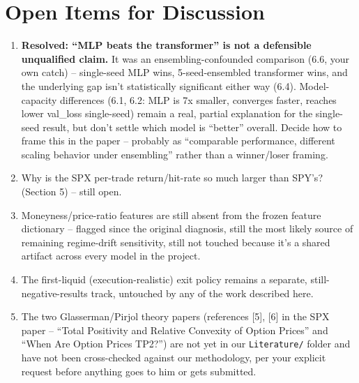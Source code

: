 \documentclass[11pt]{article}
\begin{document}
\section*{Open Items for Discussion}
\begin{enumerate}
\item \textbf{Resolved: ``MLP beats the transformer'' is not a defensible unqualified claim.} It was an
ensembling-confounded comparison (6.6, your own catch) -- single-seed MLP wins, 5-seed-ensembled
transformer wins, and the underlying gap isn't statistically significant either way (6.4). Model-capacity
differences (6.1, 6.2: MLP is 7x smaller, converges faster, reaches lower val\_loss single-seed) remain a
real, partial explanation for the single-seed result, but don't settle which model is ``better'' overall.
Decide how to frame this in the paper -- probably as ``comparable performance, different scaling behavior
under ensembling'' rather than a winner/loser framing.
\item Why is the SPX per-trade return/hit-rate so much larger than SPY's? (Section 5) -- still open.
\item Moneyness/price-ratio features are still absent from the frozen feature dictionary -- flagged since
the original diagnosis, still the most likely source of remaining regime-drift sensitivity, still not
touched because it's a shared artifact across every model in the project.
\item The first-liquid (execution-realistic) exit policy remains a separate, still-negative-results track,
untouched by any of the work described here.
\item The two Glasserman/Pirjol theory papers (references [5], [6] in the SPX paper -- ``Total Positivity
and Relative Convexity of Option Prices'' and ``When Are Option Prices TP2?'') are not yet in our
\texttt{Literature/} folder and have not been cross-checked against our methodology, per your explicit
request before anything goes to him or gets submitted.
\end{enumerate}
\end{document}
